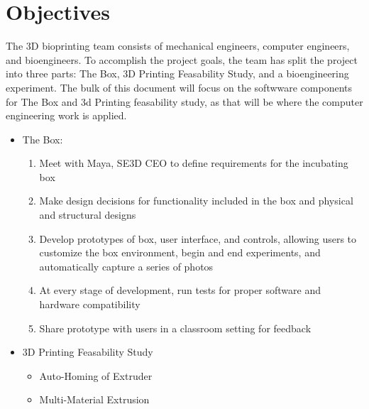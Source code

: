 

\section{Objectives}

The 3D bioprinting team consists of mechanical engineers, computer engineers, and bioengineers. To accomplish the project goals, the team has split the project into three parts: The Box, 3D Printing Feasability Study, and a bioengineering experiment. The bulk of this document will focus on the softwware components for The Box and 3d Printing feasability study, as that will be where the computer engineering work is applied.
\begin{itemize}
	\item  The Box:\\
	\begin{enumerate}
		\item Meet with Maya, SE3D CEO to define requirements for the incubating box
		\item Make design decisions for functionality included in the box and physical and structural designs
		\item Develop prototypes of box, user interface, and controls, allowing users to customize the box environment, begin and end experiments, and automatically capture a series of photos
		\item At every stage of development, run tests for proper software and hardware compatibility
		\item Share prototype with users in a classroom setting for feedback
	\end{enumerate}
	\item 3D Printing Feasability Study
	\begin{itemize}
		\item Auto-Homing of Extruder 
		
		\item Multi-Material Extrusion
	\end{itemize}
\end{itemize}